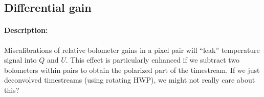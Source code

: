 \subsection{Differential gain}

\paragraph{Description:}
Miscalibrations of relative bolometer gains in a pixel pair will ``leak'' temperature signal into $Q$ and $U$.
This effect is particularly enhanced if we subtract two bolometers within pairs to obtain the polarized part of the timestream. If we just deconvolved timestreams (using rotating HWP), we might not really care about this?

%
%
